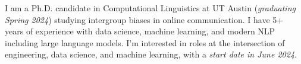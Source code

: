 I am a Ph.D. candidate in Computational Linguistics at UT Austin (\emph{graduating Spring 2024}) studying intergroup biases in online communication. I have 5+ years of experience with data science, machine learning, and modern NLP including large language models. I'm interested in roles at the intersection of engineering, data science, and machine learning, with a \emph{start date in June 2024}.

